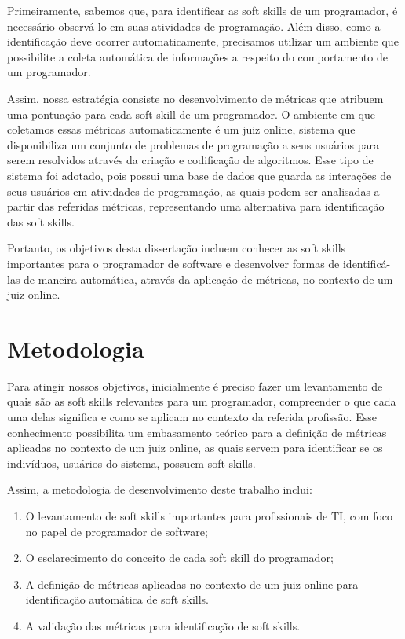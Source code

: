 Primeiramente, sabemos que, para identificar as soft skills de um programador, é necessário observá-lo em suas atividades de programação. Além disso, como a identificação deve ocorrer automaticamente, precisamos utilizar um ambiente que possibilite a coleta automática de informações a respeito do comportamento de um programador.

Assim, nossa estratégia consiste no desenvolvimento de métricas que atribuem uma pontuação para cada soft skill de um programador. O ambiente em que coletamos essas métricas automaticamente é um juiz online, sistema que disponibiliza um conjunto de problemas de programação a seus usuários para serem resolvidos através da criação e codificação de algoritmos. 
Esse tipo de sistema foi adotado, pois possui uma base de dados que guarda as interações de seus usuários em atividades de programação, as quais podem ser analisadas a partir das referidas métricas, representando uma alternativa para identificação das soft skills.

Portanto, os objetivos desta dissertação incluem conhecer as soft skills importantes para o programador de software e desenvolver formas de identificá-las de maneira automática, através da aplicação de métricas, no contexto de um juiz online.

\section{Metodologia}

Para atingir nossos objetivos, inicialmente é preciso fazer um levantamento de quais são as soft skills relevantes para um programador, compreender o que cada uma delas significa e como se aplicam no contexto da referida profissão. Esse conhecimento possibilita um embasamento teórico para a definição de métricas aplicadas no contexto de um juiz online, as quais servem para identificar se os indivíduos, usuários do sistema, possuem soft skills.

Assim, a metodologia de desenvolvimento deste trabalho inclui: 

\begin{enumerate}[label={(\roman*)}]
	\item O levantamento de soft skills importantes para profissionais de TI, com foco no papel de programador de software;
	\item O esclarecimento do conceito de cada soft skill do programador;
	\item A definição de métricas aplicadas no contexto de um juiz online para identificação automática de soft skills.
	\item A validação das métricas para identificação de soft skills.
\end{enumerate}

